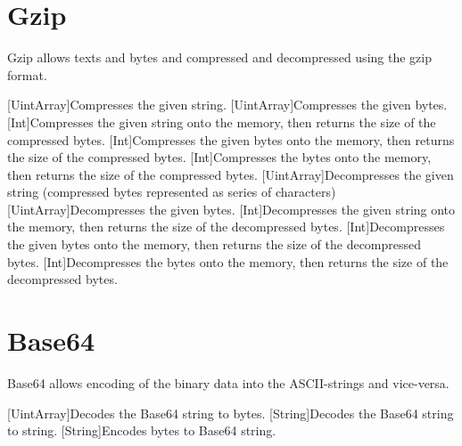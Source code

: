 \section{Gzip}

Gzip allows texts and bytes and compressed and decompressed using the gzip format.


\begin{outline}
\1[UintArray]{Compresses the given string.}
\1[UintArray]{Compresses the given bytes.}
\1[Int]{Compresses the given string onto the memory, then returns the size of the compressed bytes.}
\1[Int]{Compresses the given bytes onto the memory, then returns the size of the compressed bytes.}
\1[Int]{Compresses the bytes onto the memory, then returns the size of the compressed bytes.}
\1[UintArray]{Decompresses the given string (compressed bytes represented as series of characters)}
\1[UintArray]{Decompresses the given bytes.}
\1[Int]{Decompresses the given string onto the memory, then returns the size of the decompressed bytes.}
\1[Int]{Decompresses the given bytes onto the memory, then returns the size of the decompressed bytes.}
\1[Int]{Decompresses the bytes onto the memory, then returns the size of the decompressed bytes.}
\end{outline}



\section{Base64}

Base64 allows encoding of the binary data into the ASCII-strings and vice-versa.


\begin{outline}
\1[UintArray]{Decodes the Base64 string to bytes.}
\1[String]{Decodes the Base64 string to string.}
\1[String]{Encodes bytes to Base64 string.}
\end{outline}



